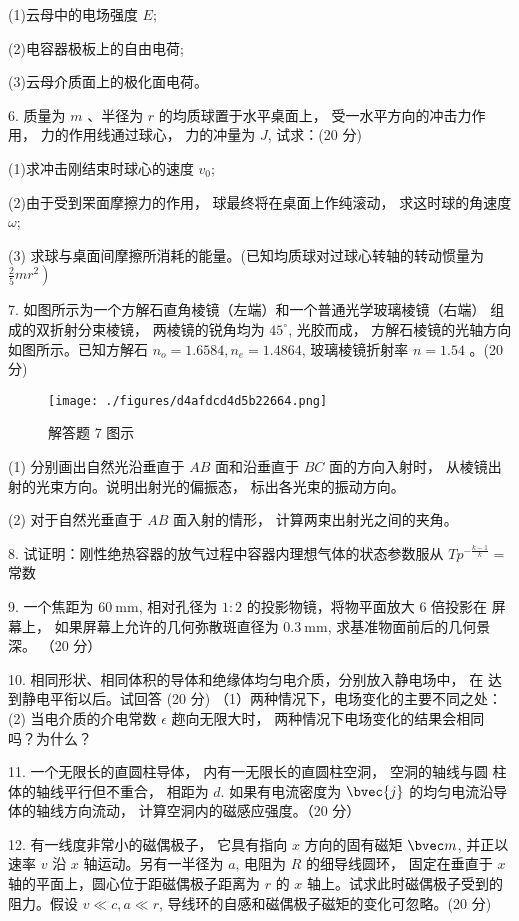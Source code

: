 (1)云母中的电场强度 $E$;

(2)电容器极板上的自由电荷;

(3)云母介质面上的极化面电荷。

6. 质量为 $m$ 、半径为 $r$ 的均质球置于水平桌面上， 受一水平方向的冲击力作用， 力的作用线通过球心， 力的冲量为 $J$, 试求：(20 分)

(1)求冲击刚结束时球心的速度 $v_{0}$;

(2)由于受到䍒面摩擦力的作用， 球最终将在桌面上作纯滚动， 求这时球的角速度 $\omega$;

(3) 求球与桌面间摩擦所消耗的能量。(已知均质球对过球心转轴的转动惯量为 $\left.\frac{2}{5} m r^{2}\right)$

7. 如图所示为一个方解石直角棱镜（左端）和一个普通光学玻璃棱镜（右端） 组成的双折射分束棱镜， 两棱镜的锐角均为 $45^{\circ}$, 光胶而成， 方解石棱镜的光轴方向如图所示。已知方解石 $n_{o}=1.6584, n_{e}=1.4864$, 玻璃棱镜折射率 $n=1.54$ 。(20 分)
\begin{figure}[ht]
\centering
\texttt{[image: ./figures/d4afdcd4d5b22664.png]}
\caption{解答题 7 图示} \label{fig_FDU15_3}
\end{figure}
(1) 分别画出自然光沿垂直于 $A B$ 面和沿垂直于 $B C$ 面的方向入射时， 从棱镜出射的光束方向。说明出射光的偏振态， 标出各光束的振动方向。

(2) 对于自然光垂直于 $A B$ 面入射的情形， 计算两束出射光之间的夹角。

8. 试证明：刚性绝热容器的放气过程中容器内理想气体的状态参数服从 $T p^{-\frac{k-1}{k}}=$ 常数

9. 一个焦距为 $60 \mathrm{~mm}$, 相对孔径为 $1: 2$ 的投影物镜，将物平面放大 $6$ 倍投影在 屏幕上， 如果屏幕上允许的几何弥散斑直径为 $0.3 \mathrm{~mm}$, 求基准物面前后的几何景深。
（20 分）

10. 相同形状、相同体积的导体和绝缘体均匀电介质，分别放入静电场中， 在 达到静电平衔以后。试回答
(20 分)
（1）两种情况下，电场变化的主要不同之处：
(2) 当电介质的介电常数 $\epsilon$ 趂向无限大时， 两种情况下电场变化的结果会相同吗？为什么？

11. 一个无限长的直圆柱导体， 内有一无限长的直圆柱空洞， 空洞的轴线与圆 柱体的轴线平行但不重合， 相距为 $d$. 如果有电流密度为 $\bvec{j}$ 的均匀电流沿导体的轴线方向流动， 计算空洞内的磁感应强度。（20 分）

12. 有一线度非常小的磁偶极子， 它具有指向 $x$ 方向的固有磁矩 $\bvec m$, 并正以速率 $v$ 沿 $x$ 轴运动。另有一半径为 $a$, 电阻为 $R$ 的细导线圆环， 固定在垂直于 $x$ 轴的平面上，圆心位于距磁偶极子距离为 $r$ 的 $x$ 轴上。试求此时磁偶极子受到的阻力。假设 $v \ll c, a \ll r$, 导线环的自感和磁偶极子磁矩的变化可忽略。(20 分)
